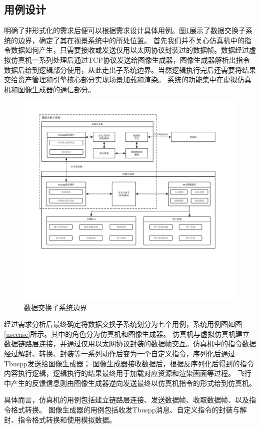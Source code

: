 \subsection{用例设计}
明确了非形式化的需求后便可以根据需求设计具体用例。图\ref{sysedge}展示了数据交换子系统的边界，确定了其在视景系统中的所处位置。
首先我们并不关心仿真机中的指令数据如何产生，只需要接收或发送仅用以太网协议封装过的数据帧。数据经过虚拟仿真机一系列处理后通过TCP协议发送给图像生成器，图像生成器解析出指令数据后给到逻辑部分使用，从此走出子系统边界。当然逻辑执行完后还需要将结果交给资产管理和引擎核心部分实现场景加载和渲染。
系统的功能集中在虚拟仿真机和图像生成器的通信部分。
\clearpage
\begin{figure}[h]
    \begin{center}
        \includegraphics[width=\textwidth]{pictures/sysedge.pdf}
        \caption{数据交换子系统边界}
        \label{sysedge}
    \end{center}
\end{figure}
\par
经过需求分析后最终确定将数据交换子系统划分为七个用例，系统用例图如图\ref{usecase}所示。其中的角色分为仿真机和图像生成器。
仿真机与虚拟仿真机建立数据链路层连接，并通过仅用以太网协议封装的数据帧交互。仿真机中的指令数据经过解封、转换、封装等一系列动作后变为一个自定义指令，序列化后通过Tbuspp发送给图像生成器；
图像生成器接收数据后，根据反序列化后得到的指令内容执行逻辑，逻辑执行的结果最终用于加载对应资源和渲染画面等过程。
飞行中产生的反馈信息则由图像生成器逆向发送最终以仿真机指令的形式给到仿真机。
\par
具体而言，仿真机的用例包括建立链路层连接、发送数据帧、收取数据帧、以及指令格式转换。
图像生成器的用例包括收发Tbuspp消息、自定义指令的封装与解封、指令格式转换和使用模拟数据。
\clearpage


